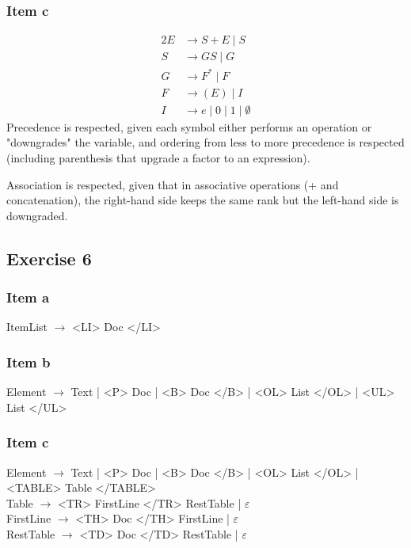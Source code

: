 \documentclass[docid=TP08]{tcom_TP}
\begin{document}
{\subsubsection{Item c}
\begin{alignat*}{2}
	E &\rightarrow S+E\mid S \\
	S &\rightarrow GS\mid G \\
	G &\rightarrow F^*\mid F \\
	F &\rightarrow (E)\mid I \\
	I &\rightarrow e\mid 0\mid 1\mid \emptyset
\end{alignat*}
Precedence is respected, given each symbol either performs an operation or "downgrades" the variable, and ordering from less to more precedence is respected (including parenthesis that upgrade a factor to an expression).\par
Association is respected, given that in associative operations (+ and concatenation), the right-hand side keeps the same rank but the left-hand side is downgraded.
\subsection{Exercise 6}
\subsubsection{Item a}
ItemList $\rightarrow$ <LI> Doc </LI>
\subsubsection{Item b}
Element $\rightarrow$ Text | <P> Doc | <B> Doc </B> | <OL> List </OL> | <UL> List </UL>
\subsubsection{Item c}
Element $\rightarrow$ Text | <P> Doc | <B> Doc </B> | <OL> List </OL> | <TABLE> Table </TABLE>\\
Table $\rightarrow$ <TR> FirstLine </TR> RestTable | $\varepsilon$\\
FirstLine $\rightarrow$ <TH> Doc </TH> FirstLine | $\varepsilon$\\
RestTable $\rightarrow$ <TD> Doc </TD> RestTable | $\varepsilon$
}
\end{document}
